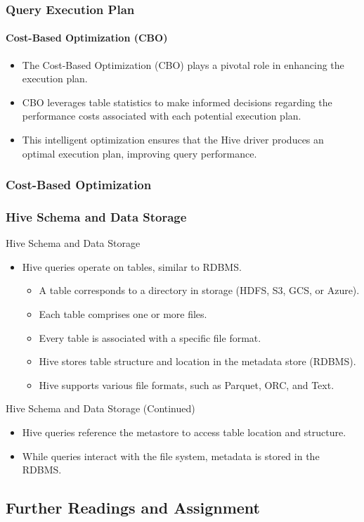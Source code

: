 	\begin{frame}
	\frametitle{Query Execution Plan}
	\framesubtitle{Cost-Based Optimization (CBO)}
	
	\begin{itemize}
	  \item The Cost-Based Optimization (CBO) plays a pivotal role in enhancing the execution plan.
	  \item CBO leverages table statistics to make informed decisions regarding the performance costs associated with each potential execution plan.
	  \item This intelligent optimization ensures that the Hive driver produces an optimal execution plan, improving query performance.
	\end{itemize}
	
	\end{frame}
\subsubsection{Cost-Based Optimization}


\subsubsection{Hive Schema and Data Storage}
\begin{frame}{Hive Schema and Data Storage}
	\begin{itemize}
		\item Hive queries operate on tables, similar to RDBMS.
		\begin{itemize}
			\item A table corresponds to a directory in storage (HDFS, S3, GCS, or Azure).
			\item Each table comprises one or more files.
			\item Every table is associated with a specific file format.
			\item Hive stores table structure and location in the metadata store (RDBMS).
			\item Hive supports various file formats, such as Parquet, ORC, and Text.
		\end{itemize}
	\end{itemize}
\end{frame}

\begin{frame}{Hive Schema and Data Storage (Continued)}
	\begin{itemize}
		\item Hive queries reference the metastore to access table location and structure.
		\item While queries interact with the file system, metadata is stored in the RDBMS.
	\end{itemize}
\end{frame}
\subsection{Further Readings and Assignment}

